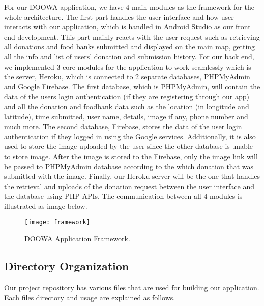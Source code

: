 \documentclass[conference]{IEEEtran}
\begin{document}
For our DOOWA application, we have 4 main modules as the framework for the whole architecture. The first part handles the user interface and how user interacts with our application, which is handled in Android Studio as our front end development. This part mainly reacts with the user request such as retrieving all donations and food banks submitted and displayed on the main map, getting all the info and list of users' donation and submission history. For our back end, we implemented 3 core modules for the application to work seamlessly which is the server, Heroku, which is connected to 2 separate databases, PHPMyAdmin and Google Firebase. The first database, which is PHPMyAdmin, will contain the data of the users login authentication (if they are registering through our app) and all the donation and foodbank data such as the location (in longitude and latitude), time submitted, user name, details, image if any, phone number and much more. The second database, Firebase, stores the data of the user login authentication if they logged in using the Google services. Additionally, it is also used to store the image uploaded by the user since the other database is unable to store image. After the image is stored to the Firebase, only the image link will be passed to PHPMyAdmin database according to the which donation that was submitted with the image. Finally, our Heroku server will be the one that handles the retrieval and uploads of the donation request between the user interface and the database using PHP APIs. The communication between all 4 modules is illustrated as image below.

\begin{figure}[h!]
\texttt{[image: framework]}
\centering
\caption{DOOWA Application Framework.}
\end{figure}

\subsection{Directory Organization}

Our project repository has various files that are used for building our application. Each files directory and usage are explained as follows.
\end{document}
